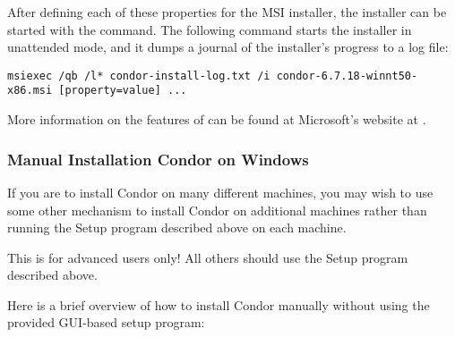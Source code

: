 After defining each of these properties for the MSI installer, the
installer can be started with the  command. The following
command starts the installer in unattended mode, and it dumps a journal of
the installer's progress to a log file:
\footnotesize
\begin{verbatim}
msiexec /qb /l* condor-install-log.txt /i condor-6.7.18-winnt50-x86.msi [property=value] ... 
\end{verbatim}
\normalsize

More information on the features of 
can be found at Microsoft's website at
.

\subsubsection{\label{sec:NT-Manual-Install}Manual Installation Condor on Windows}

If you are to install Condor on many different machines, you may wish
to use some other mechanism to install Condor on additional machines
rather than running the Setup program described above on each machine.

\Warn This is for advanced users only!  All others should use the Setup program described above. 

Here is a brief overview of how to install Condor manually without using the provided GUI-based setup program:

